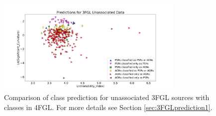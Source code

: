 \begin{table}[!h]
\hspace{-0.2cm}
    \vspace{2mm}
    \caption{Testing accuracy of the 4 selected algorithms for classification of 3FGL sources and comparison with associations in the 4FGL catalog. 
    ``\_O'' denotes training with oversampling.}
    \label{tab:selected_algs}
\end{table}



\begin{figure}[h]
\centering
\includegraphics[width=0.8\textwidth]{plots/finalclassification_3fglvs4fgl.pdf}
\caption{Comparison of class prediction for unassociated 3FGL sources with classes in 4FGL. 
For more details see Section \ref{sec:3FGLprediction1}.}
\label{fig:3FGL_vs_4FGL_classes}
\end{figure}

